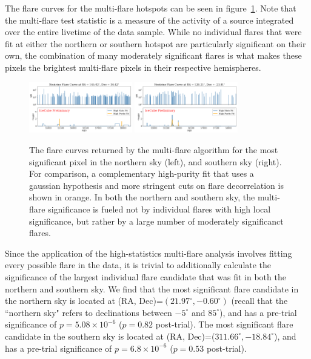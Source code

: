 The flare curves for the multi-flare hotspots can be seen in figure~\ref{fig:mfhotspots}. Note that the multi-flare test statistic is a measure of the activity of a source integrated over the entire livetime of the data sample. While no individual flares that were fit at either the northern or southern hotspot are particularly significant on their own, the combination of many moderately significant flares is what makes these pixels the brightest multi-flare pixels in their respective hemispheres. 

\begin{figure}[h]
\centering
\includegraphics[width=0.4\textwidth]{figs/fcurve_mf_north.png}
\includegraphics[width=0.4\textwidth]{figs/fcurve_mf_south.png}
\caption{The flare curves returned by the multi-flare algorithm for the most significant pixel in the northern sky (left), and southern sky (right). For comparison, a complementary high-purity fit that uses a gaussian hypothesis and more stringent cuts on flare decorrelation is shown in orange. In both the northern and southern sky, the multi-flare significance is fueled not by individual flares with high local significance, but rather by a large number of moderately significanct flares. }
\label{fig:mfhotspots}
\end{figure}

Since the application of the high-statistics multi-flare analysis involves fitting every possible flare in the data, it is trivial to additionally calculate the significance of the largest individual flare candidate that was fit in both the northern and southern sky. We find that the most significant flare candidate in the northern sky is located at (RA, Dec)=$(21.97^{\circ}, -0.60^{\circ})$ (recall that the ``northern sky" refers to declinations between $-5^{\circ}$ and $85^{\circ}$), and has a pre-trial significance of $p=5.08\times10^{-6}$ ($p=0.82$ post-trial). The most significant flare candidate in the southern sky is located at (RA, Dec)=($311.66^{\circ}, -18.84^{\circ}$), and has a pre-trial significance of $p=6.8\times10^{-6}$ ($p=0.53$ post-trial). 

